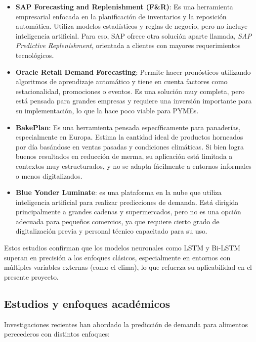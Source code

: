 \begin{itemize}
    \item \textbf{SAP Forecasting and Replenishment (F\&R)}: Es una herramienta empresarial enfocada en la planificación de inventarios y la reposición automática. Utiliza modelos estadísticos y reglas de negocio, pero no incluye inteligencia artificial. Para eso, SAP ofrece otra solución aparte llamada, \textit{SAP Predictive Replenishment}, orientada a clientes con mayores requerimientos tecnológicos.
    
    \item \textbf{Oracle Retail Demand Forecasting}: Permite hacer pronósticos utilizando algoritmos de aprendizaje automático y tiene en cuenta factores como estacionalidad, promociones o eventos. Es una solución muy completa, pero está pensada para grandes empresas y requiere una inversión importante para su implementación, lo que la hace poco viable para PYMEs.
    
    \item \textbf{BakePlan}: Es una herramienta pensada específicamente para panaderías, especialmente en Europa. Estima la cantidad ideal de productos horneados por día basándose en ventas pasadas y condiciones climáticas. Si bien logra buenos resultados en reducción de merma, su aplicación está limitada a contextos muy estructurados, y no se adapta fácilmente a entornos informales o menos digitalizados.
    
    \item \textbf{Blue Yonder Luminate}: es una plataforma en la nube que utiliza inteligencia artificial para realizar predicciones de demanda. Está dirigida principalmente a grandes cadenas y supermercados, pero no es una opción adecuada para pequeños comercios, ya que requiere cierto grado de digitalización previa y personal técnico capacitado para su uso.
\end{itemize}

Estos estudios confirman que los modelos neuronales como LSTM y Bi-LSTM superan en precisión a los enfoques clásicos, especialmente en entornos con múltiples variables externas (como el clima), lo que refuerza su aplicabilidad en el presente proyecto.

\subsection{Estudios y enfoques académicos}

Investigaciones recientes han abordado la predicción de demanda para alimentos perecederos con distintos enfoques:

